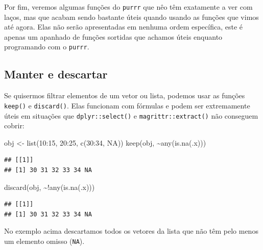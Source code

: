 \documentclass[
]{book}
\newenvironment{Shaded}{\begin{snugshade}}{\end{snugshade}}
\newcommand{\ConstantTok}[1]{\textcolor[rgb]{0.00,0.00,0.00}{#1}}
\newcommand{\DecValTok}[1]{\textcolor[rgb]{0.00,0.00,0.81}{#1}}
\newcommand{\FunctionTok}[1]{\textcolor[rgb]{0.00,0.00,0.00}{#1}}
\newcommand{\NormalTok}[1]{#1}
\newcommand{\OtherTok}[1]{\textcolor[rgb]{0.56,0.35,0.01}{#1}}
\newcommand{\SpecialCharTok}[1]{\textcolor[rgb]{0.00,0.00,0.00}{#1}}
\begin{document}
Por fim, veremos algumas funções do \texttt{purrr} que nêo têm exatamente a ver com
laços, mas que acabam sendo bastante úteis quando usando as funções que vimos
até agora. Elas não serão apresentadas em nenhuma ordem específica, este é apenas
um apanhado de funções sortidas que achamos úteis enquanto programando com o
\texttt{purrr}.

\hypertarget{manter-e-descartar}{%
\subsection{Manter e descartar}\label{manter-e-descartar}}

Se quisermos filtrar elementos de um vetor ou lista, podemos usar as funções
\texttt{keep()} e \texttt{discard()}. Elas funcionam com fórmulas e podem ser extremamente úteis
em situações que \texttt{dplyr::select()} e \texttt{magrittr::extract()} não conseguem cobrir:

\begin{Shaded}
\begin{Highlighting}[]
\NormalTok{obj }\OtherTok{\textless{}{-}} \FunctionTok{list}\NormalTok{(}\DecValTok{10}\SpecialCharTok{:}\DecValTok{15}\NormalTok{, }\DecValTok{20}\SpecialCharTok{:}\DecValTok{25}\NormalTok{, }\FunctionTok{c}\NormalTok{(}\DecValTok{30}\SpecialCharTok{:}\DecValTok{34}\NormalTok{, }\ConstantTok{NA}\NormalTok{))}
\FunctionTok{keep}\NormalTok{(obj, }\SpecialCharTok{\textasciitilde{}}\FunctionTok{any}\NormalTok{(}\FunctionTok{is.na}\NormalTok{(.x)))}
\end{Highlighting}
\end{Shaded}

\begin{verbatim}
## [[1]]
## [1] 30 31 32 33 34 NA
\end{verbatim}

\begin{Shaded}
\begin{Highlighting}[]
\FunctionTok{discard}\NormalTok{(obj, }\SpecialCharTok{\textasciitilde{}!}\FunctionTok{any}\NormalTok{(}\FunctionTok{is.na}\NormalTok{(.x)))}
\end{Highlighting}
\end{Shaded}

\begin{verbatim}
## [[1]]
## [1] 30 31 32 33 34 NA
\end{verbatim}

No exemplo acima descartamos todos os vetores da lista que não têm pelo menos um
elemento omisso (\texttt{NA}).
\end{document}
